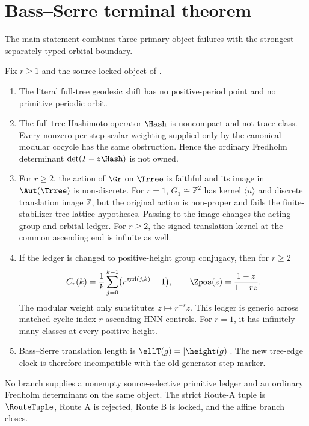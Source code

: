 \section{Bass--Serre terminal theorem}
\label{sec:main-theorem}

The main statement combines three primary-object failures with the strongest
separately typed orbital boundary.

\begin{theorem}
\label{thm:terminal}
Fix $r\ge1$ and the source-locked object of .
\begin{enumerate}
  \item The literal full-tree geodesic shift has no positive-period point and
  no primitive periodic orbit.
  \item The full-tree Hashimoto operator $\Hash$ is noncompact and not trace
  class.  Every nonzero per-step scalar weighting supplied only by the
  canonical modular cocycle has the same obstruction.  Hence the ordinary
  Fredholm determinant $\det(I-z\Hash)$ is not owned.
  \item For $r\ge2$, the action of $\Gr$ on $\Trree$ is faithful and its image
  in $\Aut(\Trree)$ is non-discrete.  For $r=1$, $G_1\cong\mathbb Z^2$ has
  kernel $\langle u\rangle$ and discrete translation image $\mathbb Z$, but
  the original action is non-proper and fails the finite-stabilizer
  tree-lattice hypotheses.  Passing to the image changes the acting group
  and orbital ledger.  For $r\ge2$, the signed-translation kernel at the
  common ascending end is infinite as well.
  \item If the ledger is changed to positive-height group conjugacy, then for
  $r\ge2$
  \[
    C_r(k)=\frac1k\sum_{j=0}^{k-1}
      \bigl(r^{\gcd(j,k)}-1\bigr),
    \qquad
    \Zpos(z)=\frac{1-z}{1-rz}.
  \]
  The modular weight only substitutes $z\mapsto r^{-s}z$.  This ledger is
  generic across matched cyclic index-$r$ ascending HNN controls.  For
  $r=1$, it has infinitely many classes at every positive height.
  \item Bass--Serre translation length is $\ellT(g)=|\height(g)|$.  The new
  tree-edge clock is therefore incompatible with the old generator-step
  marker.
\end{enumerate}
No branch supplies a nonempty source-selective primitive ledger and an
ordinary Fredholm determinant on the same object.  The strict Route-A tuple
is $\RouteTuple$, Route A is rejected, Route B is locked, and the affine
branch closes.
\end{theorem}


